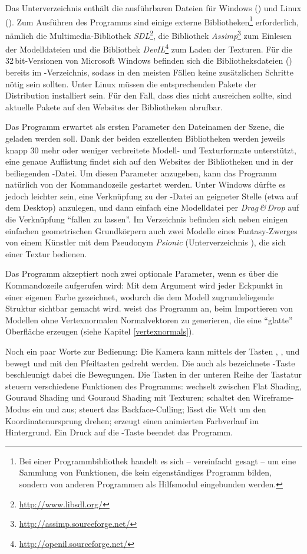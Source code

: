 Das Unterverzeichnis  enthält die ausführbaren Dateien für Windows () und Linux (). Zum Ausführen des Programms sind einige externe Bibliotheken\footnote{Bei einer Programmbibliothek handelt es sich -- vereinfacht gesagt -- um eine Sammlung von Funktionen, die kein eigenständiges Programm bilden, sondern von anderen Programmen als Hilfsmodul eingebunden werden.} erforderlich, nämlich die Multimedia-Bibliothek \emph{SDL}\footnote{\url{http://www.libsdl.org/}}, die Bibliothek \emph{Assimp}\footnote{\url{http://assimp.sourceforge.net/}} zum Einlesen der Modelldateien und die Bibliothek \emph{DevIL}\footnote{\url{http://openil.sourceforge.net/}} zum Laden der Texturen. Für die 32\,bit-Versionen von Microsoft Windows befinden sich die Bibliotheksdateien () bereits im -Verzeichnis, sodass in den meisten Fällen keine zusätzlichen Schritte nötig sein sollten. Unter Linux müssen die entsprechenden Pakete der Distribution installiert sein. Für den Fall, dass dies nicht ausreichen sollte, sind aktuelle Pakete auf den Websites der Bibliotheken abrufbar.

Das Programm erwartet als ersten Parameter den Dateinamen der Szene, die geladen werden soll. Dank der beiden exzellenten Bibliotheken werden jeweils knapp 30 mehr oder weniger verbreitete Modell- und Texturformate unterstützt, eine genaue Auflistung findet sich auf den Websites der Bibliotheken und in der beiliegenden -Datei. Um diesen Parameter anzugeben, kann das Programm natürlich von der Kommandozeile gestartet werden. Unter Windows dürfte es jedoch leichter sein, eine Verknüpfung zu der -Datei an geigneter Stelle (etwa auf dem Desktop) anzulegen, und dann einfach eine Modelldatei per \emph{Drag\,\&\,Drop} auf die Verknüpfung \enquote{fallen zu lassen}. Im Verzeichnis  befinden sich neben einigen einfachen geometrischen Grundkörpern auch zwei Modelle eines Fantasy-Zwerges von einem Künstler mit dem Pseudonym \emph{Psionic} (Unterverzeichnis ), die sich einer Textur bedienen.

Das Programm akzeptiert noch zwei optionale Parameter, wenn es über die Kommandozeile aufgerufen wird: Mit dem Argument  wird jeder Eckpunkt in einer eigenen Farbe gezeichnet, wodurch die dem Modell zugrundeliegende Struktur sichtbar gemacht wird.  weist das Programm an, beim Importieren von Modellen ohne Vertexnormalen Normalvektoren zu generieren, die eine \enquote{glatte} Oberfläche erzeugen (siehe Kapitel \ref{vertexnormals}).

Noch ein paar Worte zur Bedienung: Die Kamera kann mittels der Tasten , ,  und  bewegt und mit den Pfeiltasten gedreht werden. Die auch als  bezeichnete -Taste beschleunigt dabei die Bewegungen. Die Tasten in der unteren Reihe der Tastatur steuern verschiedene Funktionen des Programms:  wechselt zwischen Flat Shading, Gouraud Shading und Gouraud Shading mit Texturen;  schaltet den Wireframe-Modus ein und aus;  steuert das Backface-Culling;  lässt die Welt um den Koordinatenursprung drehen;  erzeugt einen animierten Farbverlauf im Hintergrund. Ein Druck auf die -Taste beendet das Programm.
